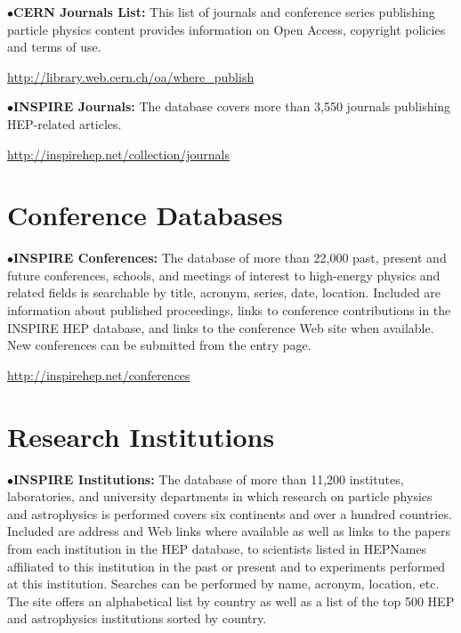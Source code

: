 \item{$\bullet$}{\bf CERN Journals List:} 
This list of journals and conference series publishing particle physics content provides information on Open Access, copyright policies and terms of use.

   \item{}\qquad\url{http://library.web.cern.ch/oa/where\_publish} 
\medskip

\item{$\bullet$}{\bf INSPIRE Journals:} 
The database covers more than 3,550 journals publishing HEP-related articles.

   \item{}\qquad\url{http://inspirehep.net/collection/journals}
\medskip


\section{Conference Databases}%

\item{$\bullet$}{\bf INSPIRE Conferences:} 
The database of more than 22,000 past, present and future conferences, schools, and meetings of interest to high-energy physics and related fields is searchable by title, acronym, series, date, location. Included are information about published proceedings, links to conference contributions in the INSPIRE HEP database, and links to the conference Web site when available. New conferences can be submitted from the entry page.
	\item{}\qquad\url{http://inspirehep.net/conferences}


\section{Research Institutions}%

\item{$\bullet$}{\bf INSPIRE Institutions:} 
The database of more than 11,200 institutes, laboratories, and university departments in which research on particle physics and astrophysics is performed covers six continents and over a hundred countries. Included are address and Web links where available as well as links to the papers from each institution in the HEP database, to scientists listed in HEPNames affiliated to this institution in the past or present and to experiments performed at this institution. Searches can be performed by name, acronym, location, etc. The site offers an alphabetical list by country as well as a list of the top 500 HEP and astrophysics institutions sorted by country.

